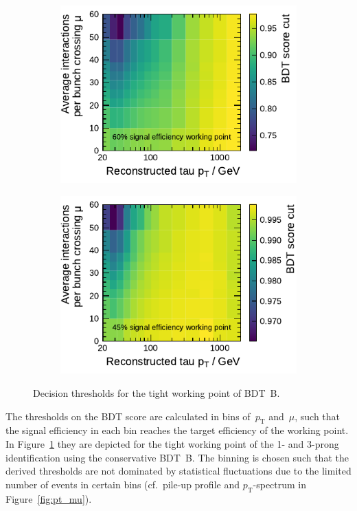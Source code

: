 \begin{figure}[htb]
  \centering
  \begin{subfigure}[t]{0.48\textwidth}
    \centering
    \includegraphics{./figures/bdt_perf/working_points/grid_1p_subsampling0269_wp.pdf}
  \end{subfigure}\hfill
  \begin{subfigure}[t]{0.48\textwidth}
    \centering
    \includegraphics{./figures/bdt_perf/working_points/grid_3p0327_wp.pdf}
  \end{subfigure}
  \caption{Decision thresholds for the tight working point of \mbox{BDT B}.}
  \label{fig:working_point_cutmap}
\end{figure}

The thresholds on the BDT score are calculated in bins of~$p_\text{T}$
and~$\mu$, such that the signal efficiency in each bin reaches the target
efficiency of the working point. In Figure~\ref{fig:working_point_cutmap} they
are depicted for the tight working point of the 1- and 3-prong identification
using the conservative \mbox{BDT B}. The binning is chosen such that the derived
thresholds are not dominated by statistical fluctuations due to the limited
number of events in certain bins (cf.\ pile-up profile and $p_\text{T}$-spectrum
in Figure~\ref{fig:pt_mu}).


